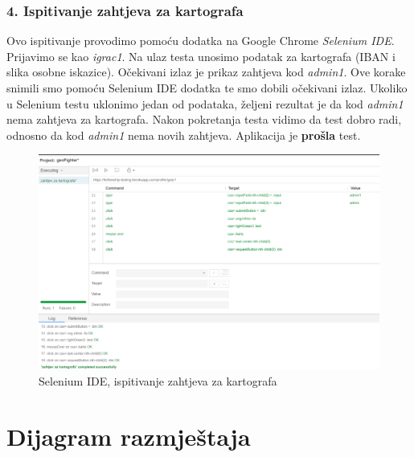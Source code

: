 			\subsubsection{4. Ispitivanje zahtjeva za kartografa}
			
				{Ovo ispitivanje provodimo pomoću dodatka na Google Chrome \emph{Selenium IDE}. Prijavimo se kao \emph{igrac1}. Na ulaz testa unosimo podatak za kartografa (IBAN i slika osobne iskazice). Očekivani izlaz je prikaz zahtjeva kod \emph{admin1}. Ove korake snimili smo pomoću Selenium IDE dodatka te smo dobili očekivani izlaz. Ukoliko u Selenium testu uklonimo jedan od podataka, željeni rezultat je da kod \emph{admin1} nema zahtjeva za kartografa. Nakon pokretanja testa vidimo da test dobro radi, odnosno da kod \emph{admin1} nema novih zahtjeva. Aplikacija je \textbf{prošla} test. }
					
					\begin{figure}[H]
						\includegraphics[width=\textwidth]{slike/SeleniumIDE_test2} 
						\centering
						\caption{Selenium IDE, ispitivanje zahtjeva za kartografa}
						\label{}
					\end{figure}
				
				
			\eject 
		
		
		\section{Dijagram razmještaja}
			
			
			
